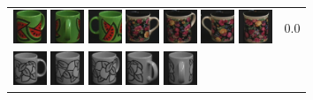 {\begin{figure}[p]
\begin{tabular}{m{11cm} | m{3cm} |}
\includegraphics[width=1cm]{coil/beeld-33.eps}
\includegraphics[width=1cm]{coil/beeld-35.eps}
\includegraphics[width=1cm]{coil/beeld-31.eps}
\includegraphics[width=1cm]{coil/beeld-60.eps}
\includegraphics[width=1cm]{coil/beeld-63.eps}
\includegraphics[width=1cm]{coil/beeld-61.eps}
\includegraphics[width=1cm]{coil/beeld-62.eps}
& {\scriptsize 0.0}
\\
\includegraphics[width=1cm]{coil/beeld-48.eps}
\includegraphics[width=1cm]{coil/beeld-50.eps}
\includegraphics[width=1cm]{coil/beeld-51.eps}
\includegraphics[width=1cm]{coil/beeld-52.eps}
\includegraphics[width=1cm]{coil/beeld-53.eps}

\end{tabular}
\end{figure}}
